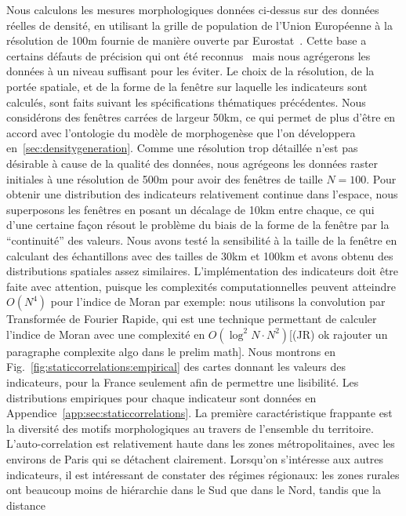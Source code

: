 {Nous calculons les mesures morphologiques données ci-dessus sur des données réelles de densité, en utilisant la grille de population de l'Union Européenne à la résolution de 100m fournie de manière ouverte par Eurostat~\cite{eurostat}. Cette base a certains défauts de précision qui ont été reconnus~\cite{bretagnolle2016ville} mais nous agrégerons les données à un niveau suffisant pour les éviter. Le choix de la résolution, de la portée spatiale, et de la forme de la fenêtre sur laquelle les indicateurs sont calculés, sont faits suivant les spécifications thématiques précédentes. Nous considérons des fenêtres carrées de largeur 50km, ce qui permet de plus d'être en accord avec l'ontologie du modèle de morphogenèse que l'on développera en~\ref{sec:densitygeneration}. Comme une résolution trop détaillée n'est pas désirable à cause de la qualité des données, nous agrégeons les données raster initiales à une résolution de 500m pour avoir des fenêtres de taille $N=100$. Pour obtenir une distribution des indicateurs relativement continue dans l'espace, nous superposons les fenêtres en posant un décalage de 10km entre chaque, ce qui d'une certaine façon résout le problème du biais de la forme de la fenêtre par la ``continuité'' des valeurs. Nous avons testé la sensibilité à la taille de la fenêtre en calculant des échantillons avec des tailles de 30km et 100km et avons obtenu des distributions spatiales assez similaires. L'implémentation des indicateurs doit être faite avec attention, puisque les complexités computationnelles peuvent atteindre $O(N^4)$ pour l'indice de Moran par exemple: nous utilisons la convolution par Transformée de Fourier Rapide, qui est une technique permettant de calculer l'indice de Moran avec une complexité en $O(\log^2 N \cdot N^2)$[(JR) ok rajouter un paragraphe complexite algo dans le prelim math]. Nous montrons en Fig.~\ref{fig:staticcorrelations:empirical} des cartes donnant les valeurs des indicateurs, pour la France seulement afin de permettre une lisibilité. Les distributions empiriques pour chaque indicateur sont données en Appendice~\ref{app:sec:staticcorrelations}. La première caractéristique frappante est la diversité des motifs morphologiques au travers de l'ensemble du territoire. L'auto-correlation est relativement haute dans les zones métropolitaines, avec les environs de Paris qui se détachent clairement. Lorsqu'on s'intéresse aux autres indicateurs, il est intéressant de constater des régimes régionaux: les zones rurales ont beaucoup moins de hiérarchie dans le Sud que dans le Nord, tandis que la distance }

